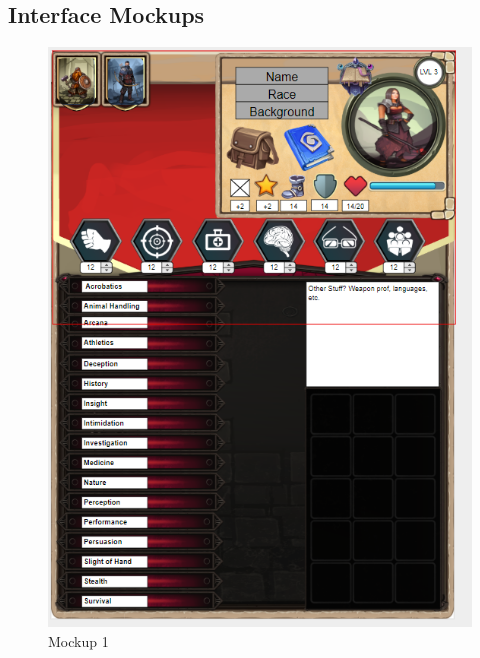 \documentclass[10pt,conference,onecolumn,compsoc]{IEEEtran}
\begin{document}
\subsection{Interface Mockups}
\begin{figure}[H]
	\centering
	\begin{minipage}[t]{4cm}
		\centering
		\includegraphics[scale=0.5]{FirstMoqup.png}
		\caption{Mockup 1}
	\end{minipage}
	\hspace{3cm}
	\begin{minipage}[t]{4cm}
		\centering

\end{minipage}
\end{figure}
\end{document}
